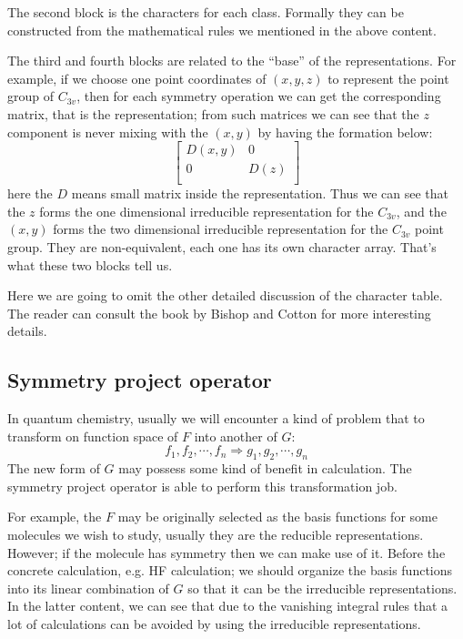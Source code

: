 The second block is the characters for each class. Formally they can
be constructed from the mathematical rules we mentioned in the above
content.

The third and fourth blocks are related to the ``base'' of the
representations. For example, if we choose one point coordinates of
$(x,y,z)$ to represent the point group of $C_{3v}$, then for each
symmetry operation we can get the corresponding matrix, that is the
representation; from such matrices we can see that the $z$ component
is never mixing with the $(x,y)$ by having the formation below:
\begin{equation}\label{}
  \begin{bmatrix}
    D(x,y) & 0    \\
    0      & D(z) \\
  \end{bmatrix}
\end{equation}
here the $D$ means small matrix inside the representation. Thus we can
see that the $z$ forms the one dimensional irreducible representation
for the $C_{3v}$, and the $(x,y)$ forms the two dimensional
irreducible representation for the $C_{3v}$ point group.  They are
non-equivalent, each one has its own character array.  That's what
these two blocks tell us.

Here we are going to omit the other detailed discussion of the
character table. The reader can consult the book by
Bishop\cite{Bishop} and Cotton\cite{Cotton} for more interesting
details.

\subsection{Symmetry project operator}
%
%
In quantum chemistry, usually we will encounter a kind of problem that
to transform on function space of $F$ into another of $G$:
\begin{equation}\label{}
  f_{1}, f_{2}, \cdots, f_{n} \Rightarrow g_{1}, g_{2}, \cdots, g_{n}
\end{equation}
The new form of $G$ may possess some kind of benefit in calculation.
The symmetry project operator is able to perform this transformation
job.

For example, the $F$ may be originally selected as the basis functions
for some molecules we wish to study, usually they are the reducible
representations. However; if the molecule has symmetry then we can
make use of it. Before the concrete calculation, e.g. HF calculation;
we should organize the basis functions into its linear combination of
$G$ so that it can be the irreducible representations. In the latter
content, we can see that due to the vanishing integral rules that a
lot of calculations can be avoided by using the irreducible
representations.

